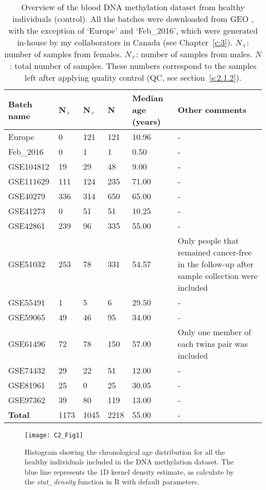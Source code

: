 \begin{table}
\small
	\begin{tabular}{ p{2cm} p{1cm} p{1cm} p{1cm} p{2cm} p{6cm} }
		\toprule
		\textbf{Batch name} & \textbf{N$_{\female}$} & \textbf{N$_{\male}$} & \textbf{N} & \textbf{Median age (years)} & \textbf{Other comments} \\
		\midrule
		Europe & 0 & 121 & 121 & 10.96 & - \\
		Feb\_2016 & 0 & 1 & 1 & 0.50 & - \\
		GSE104812 & 19 & 29 & 48 & 9.00 & - \\
		GSE111629 & 111 & 124 & 235 &  71.00 & - \\
		GSE40279 & 336 & 314 & 650 & 65.00 & - \\
		GSE41273 & 0 & 51 & 51 & 10.25 & - \\
		GSE42861 & 239 & 96 & 335 & 55.00 & - \\
		GSE51032 & 253 & 78 & 331 & 54.57 & Only people that remained cancer-free in the follow-up after sample collection were included  \\
		GSE55491 & 1 & 5 & 6 & 29.50 & - \\
		GSE59065 & 49 & 46 & 95 & 34.00 & - \\
		GSE61496 & 72 & 78 & 150 & 57.00 & Only one member of each twins pair was included \\
		GSE74432 & 29 & 22 & 51 & 12.00 & - \\
		GSE81961 & 25 & 0 & 25 & 30.05 & - \\
		GSE97362 & 39 & 80 & 119 & 13.00 & - \\
		\midrule
		\textbf{Total} & 1173 & 1045 & 2218 & 55.00 & - \\ 
		\bottomrule
	\end{tabular}
	\vspace*{3mm}
	\caption[Overview of the blood DNA methylation dataset from healthy individuals]{Overview of the blood DNA methylation dataset from healthy individuals (control). All the batches were downloaded from GEO \cite{Edgar2002}, with the exception of `Europe' and `Feb\_2016', which were generated in-house by my collaborators in Canada (see Chapter~\ref{c:3}). $N_{\female}$: number of samples from females. $N_{\male}$: number of samples from males. $N$: total number of samples. These numbers correspond to the samples left after applying quality control (QC, see section~\ref{s:2.1.2}).}
	\label{table:c2_table1}
\end{table} 


\begin{figure}[htbp!] 
	\centering    
	\texttt{[image: C2\_Fig1]}
	\vspace*{2mm}
	\caption[Chronological age distribution in the healthy individuals]{Histogram showing the chronological age distribution for all the healthy individuals included in the DNA methylation dataset. The blue line represents the 1D kernel density estimate, as calculate by the \textit{stat\_density} function in R with default parameters.}
	\label{fig:c2_fig1}
\end{figure}

